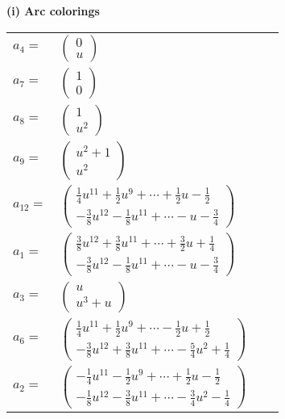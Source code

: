 \documentclass[1p]{elsarticle_modified}
\theoremstyle{definition}
\begin{document}
\flushleft \textbf{(i) Arc colorings}\\
\begin{tabular}{m{7pt} m{180pt} m{7pt} m{180pt} }
\flushright $a_{4}=$&$\begin{pmatrix}0\\u\end{pmatrix}$ \\
\flushright $a_{7}=$&$\begin{pmatrix}1\\0\end{pmatrix}$ \\
\flushright $a_{8}=$&$\begin{pmatrix}1\\u^2\end{pmatrix}$ \\
\flushright $a_{9}=$&$\begin{pmatrix}u^2+1\\u^2\end{pmatrix}$ \\
\flushright $a_{12}=$&$\begin{pmatrix}\frac{1}{4} u^{11}+\frac{1}{2} u^9+\cdots+\frac{1}{2} u-\frac{1}{2}\\-\frac{3}{8} u^{12}-\frac{1}{8} u^{11}+\cdots- u-\frac{3}{4}\end{pmatrix}$ \\
\flushright $a_{1}=$&$\begin{pmatrix}\frac{3}{8} u^{12}+\frac{3}{8} u^{11}+\cdots+\frac{3}{2} u+\frac{1}{4}\\-\frac{3}{8} u^{12}-\frac{1}{8} u^{11}+\cdots- u-\frac{3}{4}\end{pmatrix}$ \\
\flushright $a_{3}=$&$\begin{pmatrix}u\\u^3+u\end{pmatrix}$ \\
\flushright $a_{6}=$&$\begin{pmatrix}\frac{1}{4} u^{11}+\frac{1}{2} u^9+\cdots-\frac{1}{2} u+\frac{1}{2}\\-\frac{3}{8} u^{12}+\frac{3}{8} u^{11}+\cdots-\frac{5}{4} u^2+\frac{1}{4}\end{pmatrix}$ \\
\flushright $a_{2}=$&$\begin{pmatrix}-\frac{1}{4} u^{11}-\frac{1}{2} u^9+\cdots+\frac{1}{2} u-\frac{1}{2}\\-\frac{1}{8} u^{12}-\frac{3}{8} u^{11}+\cdots-\frac{3}{4} u^2-\frac{1}{4}\end{pmatrix}$ \\

\end{tabular}
\end{document}
